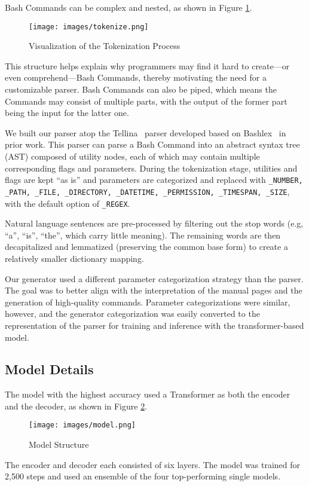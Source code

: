 \documentclass{river-journal}
\begin{document}
Bash Commands can be complex and nested, as shown in Figure \ref{fig:tokenization}.
\begin{figure}[hbpt]
\centering
\texttt{[image: images/tokenize.png]}
\caption{Visualization of the Tokenization Process}
\label{fig:tokenization}
\end{figure}
This structure helps explain why programmers may find it hard to create---or even comprehend---Bash Commands, thereby motivating the need for a customizable parser. Bash Commands can also be piped, which means the Commands may consist of multiple parts, with the output of the former part being the input for the latter one. 

We built our parser atop the Tellina~\cite{Lin2017ProgramSF} parser developed based on Bashlex~\cite{Bashlex} in prior work. This parser can parse a Bash Command into an abstract syntax tree (AST) composed of utility nodes, each of which may contain multiple corresponding flags and parameters. During the tokenization stage, utilities and flags are kept ``as is'' and parameters are categorized and replaced with \texttt{\_NUMBER, \_PATH, \_FILE, \_DIRECTORY, \_DATETIME, \_PERMISSION, \_TIMESPAN, \_SIZE}, with the default option of \texttt{\_REGEX}.

Natural language sentences are pre-processed by filtering out the stop words (e.g, ``a'', ``is'', ``the'', which carry little meaning). The remaining words are then decapitalized and lemmatized (preserving the common base form) to create a relatively smaller dictionary mapping. 

Our generator used a different parameter categorization strategy than the parser. The goal was to better align with the interpretation of the manual pages and the generation of high-quality commands. Parameter categorizations were similar, however, and the generator categorization was easily converted to the representation of the parser for training and inference with the transformer-based model.

\subsection{Model Details} 
\label{arch.modeldetails}

The model with the highest accuracy used a Transformer as both the encoder and the decoder, as shown in Figure \ref{fig:model}. 
\begin{figure}[hbpt]
\centering
\texttt{[image: images/model.png]}
\caption{Model Structure}
\label{fig:model}
\end{figure}
The encoder and decoder each consisted of six layers. The model was trained for 2,500 steps and used an ensemble of the four top-performing single models.
\end{document}
